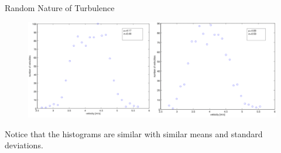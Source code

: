 
\begin{frame}{Random Nature of Turbulence}
  \begin{figure}[H]
  \centering
  \includegraphics[width=1\textwidth]{histogram.png}
  \end{figure}
  Notice that the histograms are similar with similar means and standard deviations.
\end{frame}


